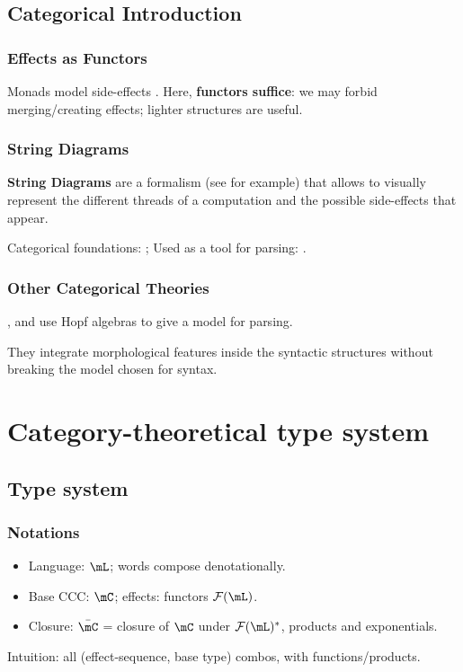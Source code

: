 \documentclass[math, english, info]{beamercours}
\begin{document}
\subsection{Categorical Introduction}
\begin{frame}
	\frametitle{Effects as Functors}
	Monads model side-effects \cite{moggiComputationalLambdacalculusMonads1989}.
	\pause
	Here, \textbf{functors suffice}: we may forbid merging/creating effects; lighter structures are useful.
\end{frame}

\begin{frame}
	\frametitle{String Diagrams}
	\textbf{String Diagrams} are a formalism (see \cite{hinzeIntroducingStringDiagrams2023}
	for example) that allows to visually represent the different threads of a
	computation and the possible side-effects that appear.

	\pause

	\medskip

	Categorical foundations: \cite{joyalGeometryTensorCalculus1991}; Used as
	a tool for parsing: \cite{coeckeMathematicalFoundationsCompositional2010}.
\end{frame}

\begin{frame}
	\frametitle{Other Categorical Theories}
	\cite{marcollimatildeetchomskynoametberwickrobertc.MathematicalStructureSyntactic},
	and \cite{senturiaAlgebraicStructureMorphosyntax2025} use Hopf algebras to
	give a model for parsing.

	\medskip

	They integrate morphological features inside the syntactic
	structures without breaking the model chosen for syntax.
\end{frame}

\section{Category-theoretical type system}
\subsection{Type system}
\begin{frame}
	\frametitle{Notations}
	\begin{itemize}
		\item Language: $\mL$; words compose denotationally.
		      \pause
		\item Base CCC: $\mC$; effects: functors $\mathcal{F}(\mL)$.
		\item Closure: $\bar{\mC}$ = closure of $\mC$ under $\mathcal{F}(\mL)^{*}$, products and exponentials.
	\end{itemize}
	Intuition: all (effect-sequence, base type) combos, with functions/products.
\end{frame}
\end{document}

